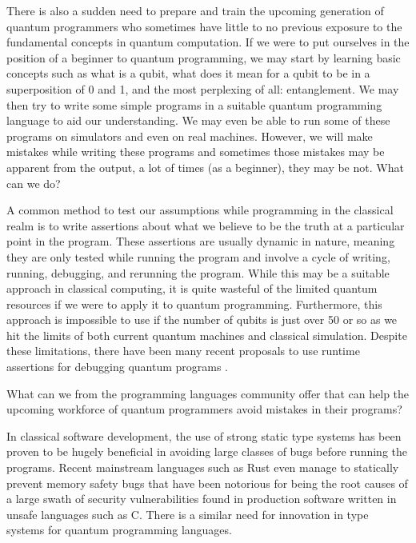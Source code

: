 \documentclass[adraft,creativecommons]{eptcs}
\theoremstyle{definition}
\theoremstyle{remark}
\begin{document}
There is also a sudden need to prepare and train the upcoming generation of quantum programmers who sometimes have little to no previous exposure to the fundamental concepts in quantum computation. If we were to put ourselves in the position of a beginner to quantum programming, we may start by learning basic concepts such as what is a qubit, what does it mean for a qubit to be in a superposition of 0 and 1, and the most perplexing of all: entanglement. We may then try to write some simple programs in a suitable quantum programming language to aid our understanding. We may even be able to run some of these programs on simulators and even on real machines. However, we will make mistakes while writing these programs and sometimes those mistakes may be apparent from the output, a lot of times (as a beginner), they may be not. What can we do?

A common method to test our assumptions while programming in the classical realm is to write assertions about what we believe to be the truth at a particular point in the program. These assertions are usually dynamic in nature, meaning they are only tested while running the program and involve a cycle of writing, running, debugging, and rerunning the program. While this may be a suitable approach in classical computing, it is quite wasteful of the limited quantum resources if we were to apply it to quantum programming. Furthermore, this approach is impossible to use if the number of qubits is just over 50 or so as we hit the limits of both current quantum machines and classical simulation. Despite these limitations, there have been many recent proposals to use runtime assertions for debugging quantum programs \parencite{Li2020,huang2019}.

What can we from the programming languages community offer that can help the upcoming workforce of quantum programmers avoid mistakes in their programs?

In classical software development, the use of strong static type systems has been proven to be hugely beneficial in avoiding large classes of bugs before running the programs. Recent mainstream languages such as Rust even manage to statically prevent memory safety bugs that have been notorious for being the root causes of a large swath of security vulnerabilities found in production software written in unsafe languages such as C. There is a similar need for innovation in type systems for quantum programming languages.
\end{document}
